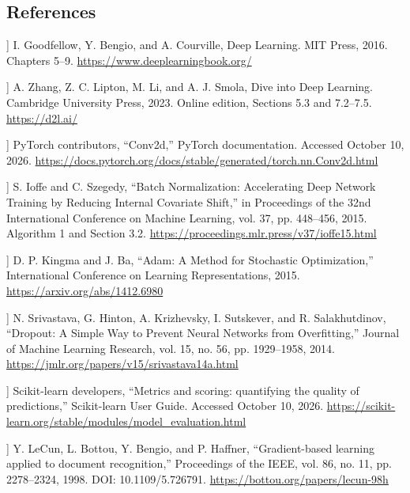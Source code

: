 \documentclass[11pt,a4paper]{article}
\begin{document}
\subsection*{References}
\begin{list}{}{\setlength{\leftmargin}{2.5em}\setlength{\labelwidth}{2em}\setlength{\labelsep}{0.5em}\setlength{\itemsep}{0.5em}}

\item[[1]] I. Goodfellow, Y. Bengio, and A. Courville, Deep Learning. MIT Press, 2016. Chapters 5--9.
\url{https://www.deeplearningbook.org/}

\item[[2]] A. Zhang, Z. C. Lipton, M. Li, and A. J. Smola, Dive into Deep Learning. Cambridge University Press, 2023. Online edition, Sections 5.3 and 7.2--7.5.
\url{https://d2l.ai/}

\item[[3]] PyTorch contributors, ``Conv2d,'' PyTorch documentation. Accessed October 10, 2026.
\url{https://docs.pytorch.org/docs/stable/generated/torch.nn.Conv2d.html}

\item[[4]] S. Ioffe and C. Szegedy, ``Batch Normalization: Accelerating Deep Network Training by Reducing Internal Covariate Shift,'' in Proceedings of the 32nd International Conference on Machine Learning, vol. 37, pp. 448--456, 2015. Algorithm 1 and Section 3.2.
\url{https://proceedings.mlr.press/v37/ioffe15.html}

\item[[5]] D. P. Kingma and J. Ba, ``Adam: A Method for Stochastic Optimization,'' International Conference on Learning Representations, 2015.
\url{https://arxiv.org/abs/1412.6980}

\item[[6]] N. Srivastava, G. Hinton, A. Krizhevsky, I. Sutskever, and R. Salakhutdinov, ``Dropout: A Simple Way to Prevent Neural Networks from Overfitting,'' Journal of Machine Learning Research, vol. 15, no. 56, pp. 1929--1958, 2014.
\url{https://jmlr.org/papers/v15/srivastava14a.html}

\item[[7]] Scikit-learn developers, ``Metrics and scoring: quantifying the quality of predictions,'' Scikit-learn User Guide. Accessed October 10, 2026.
\url{https://scikit-learn.org/stable/modules/model_evaluation.html}

\item[[8]] Y. LeCun, L. Bottou, Y. Bengio, and P. Haffner, ``Gradient-based learning applied to document recognition,'' Proceedings of the IEEE, vol. 86, no. 11, pp. 2278--2324, 1998. DOI: 10.1109/5.726791.
\url{https://bottou.org/papers/lecun-98h}


\end{list}
\end{document}
